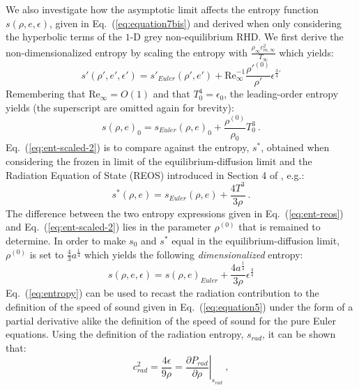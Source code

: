 \documentclass[review]{elsarticle}
\newcommand{\eqt}[1]{Eq.~(\ref{#1})}                     %
\renewcommand{\Re}{\textrm{Re}}
\begin{document}
We also investigate how the asymptotic limit affects the entropy function $s(\rho, e, \epsilon)$, given in \eqt{eq:equation7bis} and derived when only considering the hyperbolic terms of the $1$-D grey non-equilibrium RHD. We first derive the non-dimensionalized entropy by scaling the entropy with $\frac{\rho_\infty c_{m,\infty}^2}{T_\infty}$ which yields:
%
\begin{equation}\label{eq:ent-scaled}
s' \left( \rho', e', \epsilon' \right) = s'_{Euler} \left( \rho', e' \right)+ \Re_\infty^{-1} \frac{\rho'^{(0)}}{\rho'} \epsilon^{\frac{3}{4}'}
\end{equation}
%
Remembering that $\Re_\infty = O(1)$ and that $T_0^4 = \epsilon_0$, the leading-order entropy yields (the superscript are omitted again for brevity):
%
\begin{equation}\label{eq:ent-scaled-2}
s \left( \rho, e \right)_0 = s_{Euler}\left( \rho, e \right)_{0} + \frac{\rho^{(0)}}{\rho_0} T_0^3 \ .
\end{equation}
%
\eqt{eq:ent-scaled-2} is to compare against the entropy, $s^*$, obtained when considering the frozen in limit of the equilibrium-diffusion limit and the Radiation Equation of State (REOS) introduced in Section 4 of \cite{LowrieMorel}, e.g.:
%
\begin{equation}\label{eq:ent-reos}
s^*(\rho,e) = s_{Euler}(\rho,e) + \frac{4T^3}{3\rho} \ .
\end{equation}
%
The difference between the two entropy expressions given in \eqt{eq:ent-reos} and \eqt{eq:ent-scaled-2} lies in the parameter $\rho^{(0)}$ that is remained to determine. In order to make $s_0$ and $s^*$ equal in the equilibrium-diffusion limit, $\rho^{(0)}$ is set to $\frac{4}{3}a^\frac{1}{4}$ which yields the following \emph{dimensionalized} entropy:
%
\begin{equation}\label{eq:entropy}
s \left( \rho, e, \epsilon \right) = s\left( \rho, e \right)_{Euler} + \frac{4a^\frac{1}{4}}{3\rho} \epsilon^\frac{3}{4}
\end{equation}
%
\eqt{eq:entropy} can be used to recast the radiation contribution to the definition of the speed of sound given in \eqt{eq:equation5} under the form of a partial derivative alike the definition of the speed of sound for the pure Euler equations. Using the definition of the radiation entropy, $s_{rad}$, it can be shown that:
%
\begin{equation}\label{eq:sp-sd-rad}
c^2_{rad} = \frac{4 \epsilon}{9 \rho} = \left. \frac{\partial P_{rad}}{\partial \rho}\right|_{s_{rad}} \ ,
\end{equation}
\end{document}
